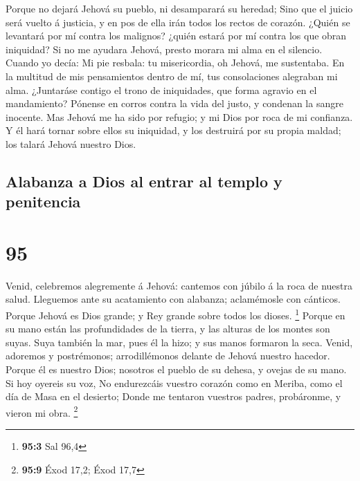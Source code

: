  Porque no dejará Jehová su pueblo, ni desamparará su
heredad;  Sino que el juicio será vuelto á justicia, y en
pos de ella irán todos los rectos de corazón.  ¿Quién se
levantará por mí contra los malignos? ¿quién estará por mí contra los
que obran iniquidad?  Si no me ayudara Jehová, presto
morara mi alma en el silencio.  Cuando yo decía: Mi pie
resbala: tu misericordia, oh Jehová, me sustentaba.  En la
multitud de mis pensamientos dentro de mí, tus consolaciones alegraban
mi alma.  ¿Juntaráse contigo el trono de iniquidades, que
forma agravio en el mandamiento?  Pónense en corros contra
la vida del justo, y condenan la sangre inocente.  Mas
Jehová me ha sido por refugio; y mi Dios por roca de mi confianza.
 Y él hará tornar sobre ellos su iniquidad, y los destruirá
por su propia maldad; los talará Jehová nuestro Dios.

\hypertarget{alabanza-a-dios-al-entrar-al-templo-y-penitencia}{%
\subsection{Alabanza a Dios al entrar al templo y
penitencia}\label{alabanza-a-dios-al-entrar-al-templo-y-penitencia}}

\hypertarget{section-94}{%
\section{95}\label{section-94}}

 Venid, celebremos alegremente á Jehová: cantemos con júbilo
á la roca de nuestra salud.  Lleguemos ante su acatamiento
con alabanza; aclamémosle con cánticos.  Porque Jehová es
Dios grande; y Rey grande sobre todos los dioses. \footnote{\textbf{95:3}
  Sal 96,4}  Porque en su mano están las profundidades de la
tierra, y las alturas de los montes son suyas.  Suya también
la mar, pues él la hizo; y sus manos formaron la seca. 
Venid, adoremos y postrémonos; arrodillémonos delante de Jehová nuestro
hacedor.  Porque él es nuestro Dios; nosotros el pueblo de
su dehesa, y ovejas de su mano. Si hoy oyereis su voz,  No
endurezcáis vuestro corazón como en Meriba, como el día de Masa en el
desierto;  Donde me tentaron vuestros padres, probáronme, y
vieron mi obra. \footnote{\textbf{95:9} Éxod 17,2; Éxod 17,7}

